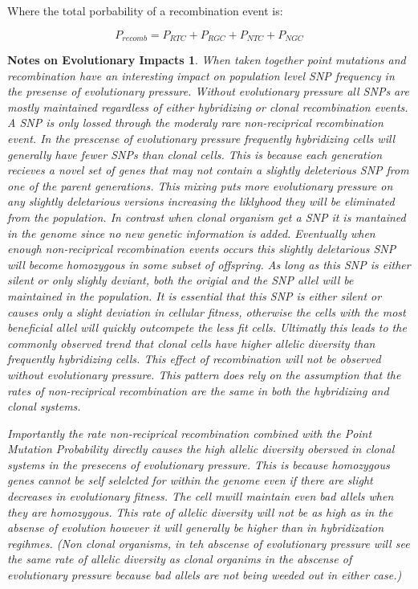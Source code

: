 \documentclass{article}
\newtheorem{evo_impacts}{Notes on Evolutionary Impacts}
\begin{document}
        Where the total porbability of a recombination event is:

        \begin{equation}
            P_{recomb} = P_{RTC} + P_{RGC} + P_{NTC} + P_{NGC}
        \end{equation}


    \begin{evo_impacts}
        When taken together point mutations and recombination have an interesting impact on population level SNP frequency in the presense of evolutionary pressure.  Without evolutionary pressure all SNPs are mostly maintained regardless of either hybridizing or clonal recombination events.  A SNP is only lossed through the moderaly rare non-reciprical recombination event.  In the prescense of evolutionary pressure frequently hybridizing cells will generally have fewer SNPs than clonal cells.  This is because each generation recieves a novel set of genes that may not contain a slightly deleterious SNP from one of the parent generations.  This mixing puts more evolutionary pressure on any slightly deletarious versions increasing the liklyhood they will be eliminated from the population.  In contrast when clonal organism get a SNP it is mantained in the genome since no new genetic information is added. Eventually when enough non-reciprical recombination events occurs this slightly deletarious SNP will become homozygous in some subset of offspring.  As long as this SNP is either silent or only slighly deviant, both the origial and the SNP allel will be maintained in the population.  It is essential that this SNP is either silent or causes only a slight deviation in cellular fitness, otherwise the cells with the most beneficial allel will quickly outcompete the less fit cells.  Ultimatly this leads to the commonly observed trend that clonal cells have higher allelic diversity than frequently hybridizing cells.   This effect of recombination will not be observed without evolutionary pressure.  This pattern does rely on the assumption that the rates of non-reciprical recombination are the same in both the hybridizing and clonal systems.

        Importantly the rate non-reciprical recombination combined with the Point Mutation Probability directly causes the high allelic diversity obersved in clonal systems in the presecens of evolutionary pressure.  This is because homozygous genes cannot be self selelcted for within the genome even if there are slight decreases in evolutionary fitness.  The cell mwill maintain even bad allels when they are homozygous.  This rate of allelic diversity will not be as high as in the absense of evolution however it will generally be higher than in hybridization regihmes. (Non clonal organisms, in teh abscense of evolutionary pressure will see the same rate of allelic diversity as clonal organims in the abscense of evolutionary pressure because bad allels are not being weeded out in either case.)
    \end{evo_impacts}
\end{document}
